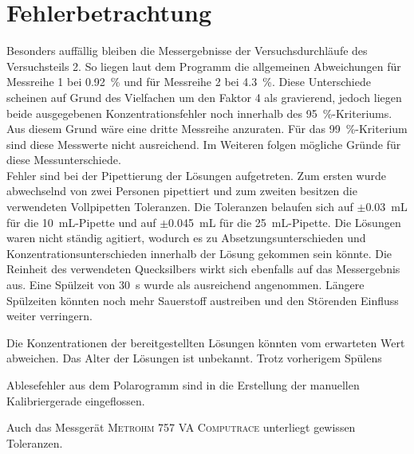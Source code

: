 \section{Fehlerbetrachtung}
\label{sec:fehler}


Besonders auffällig bleiben die Messergebnisse der Versuchsdurchläufe des Versuchsteils 2. So liegen laut dem Programm die allgemeinen Abweichungen für Messreihe 1 bei \SI{0,92}{\percent} und für Messreihe 2 bei \SI{4,3}{\percent}. Diese Unterschiede scheinen auf Grund des Vielfachen um den Faktor 4 als gravierend, jedoch liegen beide ausgegebenen Konzentrationsfehler noch innerhalb des \SI{95}{\percent}-Kriteriums. Aus diesem Grund wäre eine dritte Messreihe anzuraten. Für das \SI{99}{\percent}-Kriterium sind diese Messwerte nicht ausreichend. Im Weiteren folgen mögliche Gründe für diese Messunterschiede.\\

Fehler sind bei der Pipettierung der Lösungen aufgetreten. Zum ersten wurde abwechselnd von zwei Personen pipettiert und zum zweiten besitzen die verwendeten Vollpipetten Toleranzen. Die Toleranzen belaufen sich auf $\pm$\SI{0,03}{\milli\liter} für die \SI{10}{\milli\liter}-Pipette und auf $\pm$\SI{0,045}{\milli\liter} für die \SI{25}{\milli\liter}-Pipette. Die Lösungen waren nicht ständig agitiert, wodurch es zu Absetzungsunterschieden und Konzentrationsunterschieden innerhalb der Lösung gekommen sein könnte. Die Reinheit des verwendeten Quecksilbers wirkt sich ebenfalls auf das Messergebnis aus. Eine Spülzeit von \SI{30}{\second} wurde als ausreichend angenommen. Längere Spülzeiten könnten noch mehr Sauerstoff austreiben und den Störenden Einfluss weiter verringern.

Die Konzentrationen der bereitgestellten Lösungen könnten vom erwarteten Wert abweichen. Das Alter der Lösungen ist unbekannt. Trotz vorherigem Spülens

Ablesefehler aus dem Polarogramm sind in die Erstellung der manuellen Kalibriergerade eingeflossen.


Auch das Messgerät \textsc{Metrohm 757 VA Computrace} unterliegt gewissen Toleranzen.